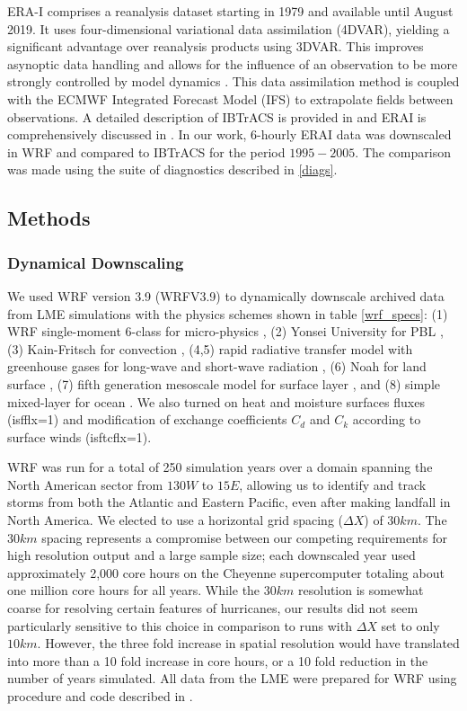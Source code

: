 \documentclass[smallextended]{svjour3}       %
\begin{document}
ERA-I comprises a reanalysis dataset starting in 1979 and available
until August 2019. It uses four-dimensional variational data
assimilation (4DVAR), yielding a significant advantage over reanalysis
products using 3DVAR. This improves asynoptic data handling and allows
for the influence of an observation to be more strongly controlled by
model dynamics \cite{tc_reanal:2}. This data assimilation method is
coupled with the ECMWF Integrated Forecast Model (IFS) to extrapolate
fields between observations. A detailed description of IBTrACS is
provided in \cite{ibtracs} and ERAI is comprehensively discussed in
\cite{erai_reanal}. In our work, $6$-hourly ERAI data was downscaled
in WRF and compared to IBTrACS for the period $1995-2005$. The
comparison was made using the suite of diagnostics described in
\ref{diags}.

\subsection{Methods}
\subsubsection{Dynamical Downscaling}
\label{WRF}
We used WRF version 3.9 (WRFV3.9) \cite{wrf_tech} to dynamically
downscale archived data from LME simulations with the physics schemes
shown in table \ref{wrf_specs}: (1) WRF single-moment 6-class for
micro-physics \cite{mp_phys}, (2) Yonsei University for PBL
\cite{pbl_phys}, (3) Kain-Fritsch for convection \cite{cu_phys}, (4,5)
rapid radiative transfer model with greenhouse gases for long-wave and
short-wave radiation \cite{rad_phys}, (6) Noah for land surface
\cite{sfc_phys}, (7) fifth generation mesoscale model for surface
layer \cite{sfclay_phys:1,sfclay_phys:2,sfclay_phys:3}, and
(8) simple mixed-layer for ocean \cite{ocn_phys}. We also turned on
heat and moisture surfaces fluxes (isfflx=1) and modification of
exchange coefficients $C_d$ and $C_k$ according to surface winds
(isftcflx=1).

WRF was run for a total of 250 simulation years over a domain spanning
the North American sector from $130W$ to $15E$, allowing us to
identify and track storms from both the Atlantic and Eastern Pacific,
even after making landfall in North America. We elected to use a
horizontal grid spacing ($\Delta X$) of $30km$. The $30km$ spacing
represents a compromise between our competing requirements for high
resolution output and a large sample size; each downscaled year used
approximately 2,000 core hours on the Cheyenne supercomputer totaling
about one million core hours for all years. While the $30km$
resolution is somewhat coarse for resolving certain features of
hurricanes, our results did not seem particularly sensitive to this
choice in comparison to runs with $\Delta X$ set to only $10km$. However, the
three fold increase in spatial resolution would have translated into
more than a 10 fold increase in core hours, or a 10 fold reduction in
the number of years simulated. All data from the LME were prepared for WRF using procedure and code described in \cite{tech_notes}.
\end{document}
